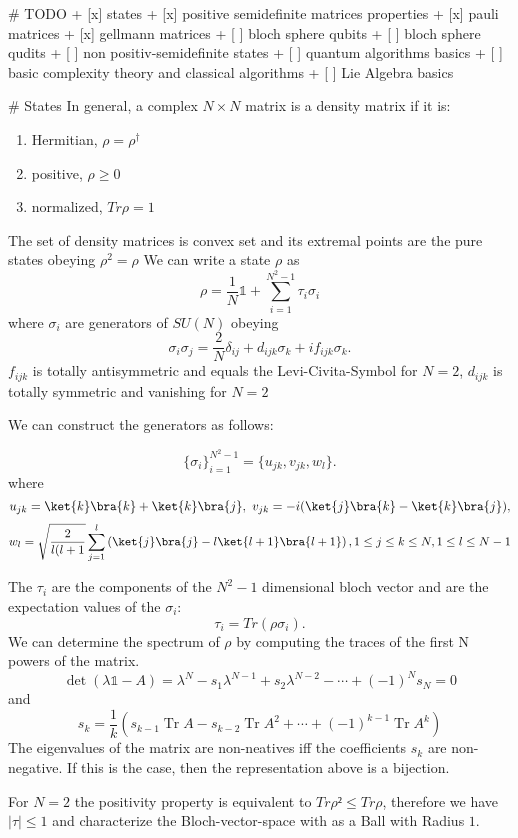 # TODO
+ [x] states
+ [x] positive semidefinite matrices properties
+ [x] pauli matrices
+ [x] gellmann matrices
+ [ ] bloch sphere qubits
+ [ ] bloch sphere qudits
+ [ ] non positiv-semidefinite states
+ [ ] quantum algorithms basics
+ [ ] basic complexity theory and classical algorithms
+ [ ] Lie Algebra basics


# States
In general, a complex $N \times N$ matrix is a density matrix if it is:
\begin{enumerate}[label=(\roman*)]
	\item Hermitian,	$\rho =\rho^{\dagger}$
	\item positive,		$\rho \ge 0$
	\item normalized,	$Tr\rho = 1$
\end{enumerate}
The set of density matrices is convex set and its extremal points are the pure states obeying $\rho^2 = \rho$
We can write a state $\rho$ as
$$\rho = \frac{1}{N} \mathbb{1} + \sum_{i=1}^{N^2-1} \tau_i \sigma_i$$
where $\sigma_i$ are generators of $SU(N)$ obeying
\[
	\sigma_i\sigma_j = \frac{2}{N}\delta_{ij} + d_{ijk}\sigma_k + if_{ijk}\sigma_k
.\]
$f_{ijk}$ is totally antisymmetric and equals the Levi-Civita-Symbol for $N=2$, $d_{ijk}$ is totally symmetric and vanishing for $N=2$

We can construct the generators as follows:

 \[
\{\sigma_i\}^{N^2-1}_{i=1} = \{u_{jk},v_{jk},w_l\}
.\]
where
$$
	u_{jk} = \ket{k}\bra{k}+\ket{k}\bra{j}, ~ v_{jk} = -i(\ket{j}\bra{k}-\ket{k}\bra{j}),
$$
$$
	w_l = \sqrt{\frac{2}{l(l+1}} \sum_{j=1}^{l} \left( \ket{j}\bra{j}-l\ket{l+1}\bra{l+1} \right),
	1\le j\le k\le N, 1\le l\le N-1
$$

The $\tau_i$ are the components of the $N^2-1$ dimensional bloch vector and are the expectation values of the $\sigma_i$:
 \[
	 \tau_i = Tr(\rho\sigma_i)
.\]
We can determine the spectrum of $\rho$ by computing the traces of the first N powers of the matrix.
$$\operatorname{det}(\lambda \mathbb{1}-A)=\lambda^{N}-s_{1} \lambda^{N-1}+s_{2} \lambda^{N-2}-\cdots+(-1)^{N} s_{N}=0$$
and
$$s_{k}=\frac{1}{k}\left(s_{k-1} \operatorname{Tr} A-s_{k-2} \operatorname{Tr} A^{2}+\cdots+(-1)^{k-1} \operatorname{Tr} A^{k}\right)$$
The eigenvalues of the matrix are non-neatives iff the coefficients $s_k$ are non-negative.
If this is the case, then the representation above is a bijection.

For $N=2$ the positivity property is equivalent to $Tr\rho²\le Tr\rho$, therefore we have $|\tau|\le 1$ and characterize the Bloch-vector-space with as a Ball with Radius $1$.

